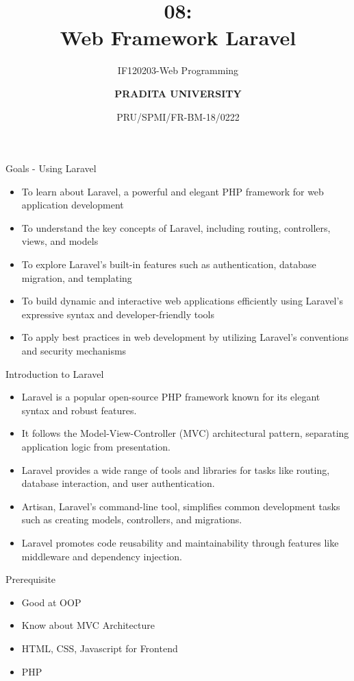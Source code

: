 \documentclass[aspectratio=169, table]{beamer}
\subtitle{IF120203-Web Programming}
\title{\Huge {\textbf{08: \\Web Framework Laravel}}}
\date[Serial]{\scriptsize {PRU/SPMI/FR-BM-18/0222}}
\author[Pradita]{\small {\textbf{PRADITA UNIVERSITY}}}
\begin{document}
\begin{frame}
    \titlepage
\end{frame}

\begin{frame}{Goals - Using Laravel}
    \begin{itemize}
        \item To learn about Laravel, a powerful and elegant PHP framework for web application development
        \item To understand the key concepts of Laravel, including routing, controllers, views, and models
        \item To explore Laravel's built-in features such as authentication, database migration, and templating
        \item To build dynamic and interactive web applications efficiently using Laravel's expressive syntax and developer-friendly tools
        \item To apply best practices in web development by utilizing Laravel's conventions and security mechanisms
    \end{itemize}
\end{frame}

\begin{frame}{Introduction to Laravel}
    \begin{itemize}
        \item Laravel is a popular open-source PHP framework known for its elegant syntax and robust features.
        \item It follows the Model-View-Controller (MVC) architectural pattern, separating application logic from presentation.
        \item Laravel provides a wide range of tools and libraries for tasks like routing, database interaction, and user authentication.
        \item Artisan, Laravel's command-line tool, simplifies common development tasks such as creating models, controllers, and migrations.
        \item Laravel promotes code reusability and maintainability through features like middleware and dependency injection.
    \end{itemize}
\end{frame}

\begin{frame}{Prerequisite}
    \vskip-1cm
    \begin{itemize}
        \item Good at OOP
        \item Know about MVC Architecture
        \item HTML, CSS, Javascript for Frontend
        \item PHP
    \end{itemize}
\end{frame}
\end{document}
